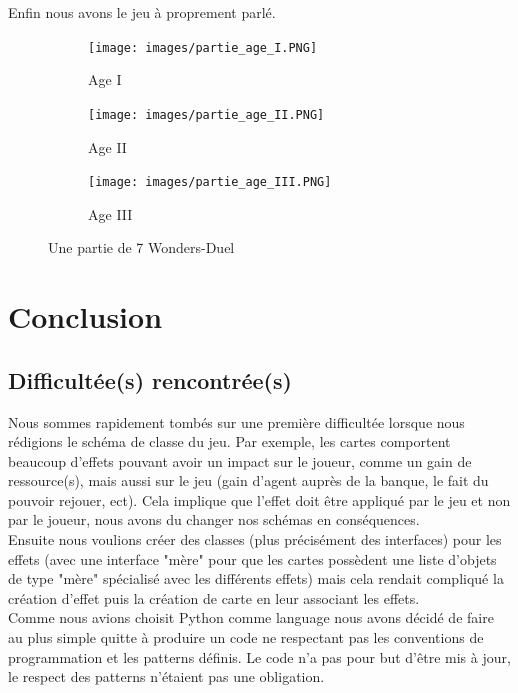 \documentclass[12pt]{article}
\begin{document}
        \newpage
	    Enfin nous avons le jeu à proprement parlé.
	    \begin{figure}[htbp]
            \centering
            \begin{subfigure}{.55\textwidth}
                \texttt{[image: images/partie\_age\_I.PNG]}
                \caption{Age I}
    	    \end{subfigure}
    	    \begin{subfigure}{.55\textwidth}
                \texttt{[image: images/partie\_age\_II.PNG]}
                \caption{Age II}
    	    \end{subfigure}
    	    \begin{subfigure}{.55\textwidth}
                \texttt{[image: images/partie\_age\_III.PNG]}
                \caption{Age III}
    	    \end{subfigure}
            \caption{Une partie de 7 Wonders-Duel}
        \end{figure}
	
    \newpage
	\section{Conclusion}
	    \subsection{Difficultée(s) rencontrée(s)}
    	Nous sommes rapidement tombés sur une première difficultée lorsque nous rédigions le schéma de classe du jeu. Par exemple, les cartes comportent beaucoup d'effets pouvant avoir un impact sur le joueur, comme un gain de ressource(s), mais aussi sur le jeu (gain d'agent auprès de la banque, le fait du pouvoir rejouer, ect). Cela implique que l'effet doit être appliqué par le jeu et non par le joueur, nous avons du changer nos schémas en conséquences.\\
    	Ensuite nous voulions créer des classes (plus précisément des interfaces) pour les effets (avec une interface "mère" pour que les cartes possèdent une liste d'objets de type "mère" spécialisé avec les différents effets) mais cela rendait compliqué la création d'effet puis la création de carte en leur associant les effets.\\
    	Comme nous avions choisit Python comme language nous avons décidé de faire au plus simple quitte à produire un code ne respectant pas les conventions de programmation et les patterns définis. Le code n'a pas pour but d'être mis à jour, le respect des patterns n'étaient pas une obligation. 
    	
\end{document}
